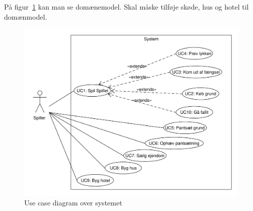 \documentclass[class=article, crop=false]{standalone}
\begin{document}
    På figur~\ref{fig:use_case_model} kan man se domænemodel. Skal måske tilføje skøde, hus og hotel til domænmodel.

    \begin{figure}[H]
        \centering

        \includegraphics[scale=0.7]{diagrams/use_case_diagram.pdf}
        \caption{Use case diagram over systemet}\label{fig:use_case_model}
    \end{figure}
\end{document}
